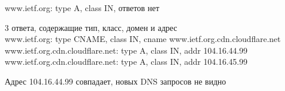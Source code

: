 \documentclass[a4paper,11pt]{article}
\begin{document}
www.ietf.org: type A, class IN, ответов нет

\begin{center}
\label{fig:image}
\end{center}

3 ответа, содержащие тип, класс, домен и адрес \\
www.ietf.org: type CNAME, class IN, cname www.ietf.org.cdn.cloudflare.net \\
www.ietf.org.cdn.cloudflare.net: type A, class IN, addr 104.16.44.99 \\
www.ietf.org.cdn.cloudflare.net: type A, class IN, addr 104.16.45.99 \\

\begin{center}
\label{fig:image}
\end{center}
Адрес 104.16.44.99 совпадает,
новых DNS запросов не видно
\end{document}
